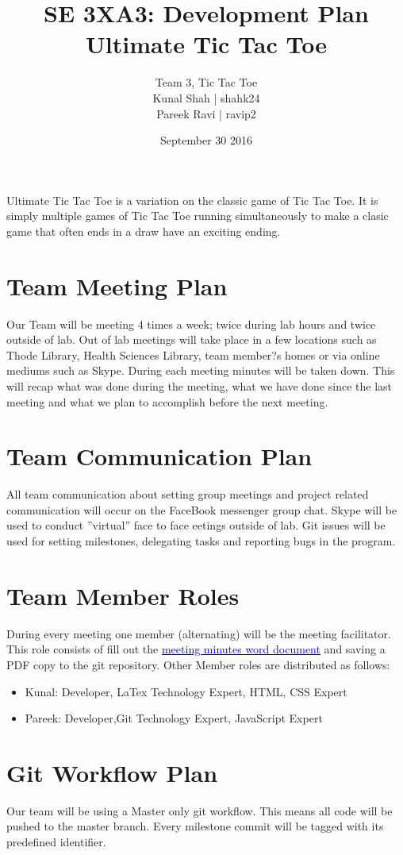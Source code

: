 \documentclass{article}
\title{SE 3XA3: Development Plan\\Ultimate Tic Tac Toe}
\author{Team 3, Tic Tac Toe
		\\ Kunal Shah | shahk24
		\\ Pareek Ravi | ravip2
}
\date{September 30 2016}
\begin{document}
\maketitle

Ultimate Tic Tac Toe is a variation on the classic game of Tic Tac Toe. It is 
simply multiple games of Tic Tac Toe running simultaneously to make a clasic 
game that often ends in a draw have an exciting ending.

\section{Team Meeting Plan}
Our Team will be meeting 4 times a week; twice during lab hours and twice 
outside of lab. Out of lab meetings will take place in a few locations such as
Thode Library, Health Sciences Library, team member?s homes or via online 
 mediums such as Skype. During each meeting minutes will be taken down. 
 This will recap what was done during the meeting, what we have done since the 
last meeting and what we plan to accomplish before the next meeting.

\section{Team Communication Plan}
All team communication about setting group
meetings and project related communication will occur on the FaceBook messenger
group chat. Skype will be used to conduct ''virtual'' face to face eetings
outside of lab. Git issues will be used for setting milestones, delegating tasks
and reporting bugs in the program.

\section{Team Member Roles}
During every meeting one member (alternating) will
be the meeting facilitator. This role consists of fill out the \href{run:3XA3
Meeting Summary Template.docx}{\textcolor{blue}{meeting minutes word document}}
and saving a PDF copy to the git repository. Other Member roles are distributed
as follows:
\begin{itemize}
  \item Kunal: Developer, LaTex Technology Expert, HTML, CSS Expert 
  \item Pareek: Developer,Git Technology Expert, JavaScript Expert 

\end{itemize}

\section{Git Workflow Plan}
Our team will be using a Master only git workflow. This means all code will be pushed 
to the master branch. Every milestone commit will be tagged with its predefined identifier.
\end{document}

